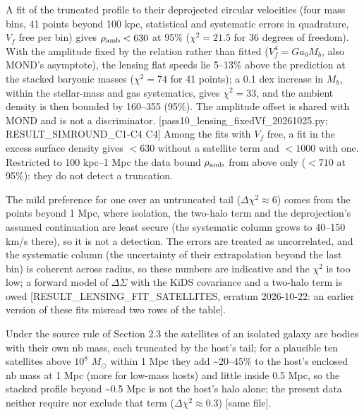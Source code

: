 \documentclass[
  10pt,
]{article}
\begin{document}
A fit of the truncated profile to their deprojected circular velocities (four mass bins, 41 points beyond 100 kpc, statistical and systematic errors in quadrature, $V_f$ free per bin) gives $\rho_{\rm amb}<630$ at 95\% ($\chi^2=21.5$ for 36 degrees of freedom). With the amplitude fixed by the relation rather than fitted ($V_f^4=Ga_0M_b$, also MOND's asymptote), the lensing flat speeds lie 5--13\% above the prediction at the stacked baryonic masses ($\chi^2=74$ for 41 points); a 0.1 dex increase in $M_b$, within the stellar-mass and gas systematics, gives $\chi^2=33$, and the ambient density is then bounded by 160--355 (95\%). The amplitude offset is shared with MOND and is not a discriminator. {[}pass10\_lensing\_fixedVf\_20261025.py; RESULT\_SIMROUND\_C1-C4 C4{]} Among the fits with $V_f$ free, a fit in the excess surface density gives $<630$ without a satellite term and $<1000$ with one. Restricted to 100 kpc--1 Mpc the data bound $\rho_{\rm amb}$ from above only ($<710$ at 95\%): they do not detect a truncation.

The mild preference for one over an untruncated tail ($\Delta\chi^2\approx6$) comes from the points beyond 1 Mpc, where isolation, the two-halo term and the deprojection's assumed continuation are least secure (the systematic column grows to 40--150 km/s there), so it is not a detection. The errors are treated as uncorrelated, and the systematic column (the uncertainty of their extrapolation beyond the last bin) is coherent across radius, so these numbers are indicative and the $\chi^2$ is too low; a forward model of $\Delta\Sigma$ with the KiDS covariance and a two-halo term is owed {[}RESULT\_LENSING\_FIT\_SATELLITES, erratum 2026-10-22: an earlier version of these fits misread two rows of the table{]}.

Under the source rule of Section 2.3 the satellites of an isolated galaxy are bodies with their own nb mass, each truncated by the host's tail; for a plausible ten satellites above $10^{8}$ $M_\odot$ within 1 Mpc they add \textasciitilde{}20--45\% to the host's enclosed nb mass at 1 Mpc (more for low-mass hosts) and little inside 0.5 Mpc, so the stacked profile beyond \textasciitilde{}0.5 Mpc is not the host's halo alone; the present data neither require nor exclude that term ($\Delta\chi^2\approx0.3$) {[}same file{]}.
\end{document}
